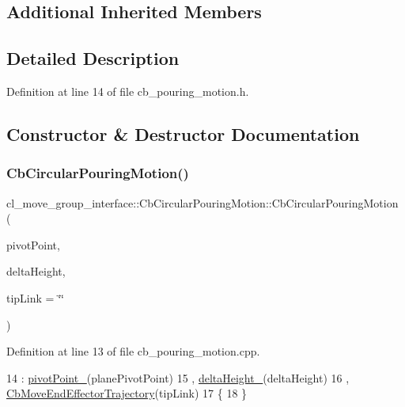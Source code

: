 \subsection*{Additional Inherited Members}


\subsection{Detailed Description}


Definition at line 14 of file cb\+\_\+pouring\+\_\+motion.\+h.



\subsection{Constructor \& Destructor Documentation}
\mbox{\label{classcl__move__group__interface_1_1CbCircularPouringMotion_a774a9d74ca112002c89a375f06166257}} 
\subsubsection{\texorpdfstring{Cb\+Circular\+Pouring\+Motion()}{CbCircularPouringMotion()}}
{\footnotesize\ttfamily cl\+\_\+move\+\_\+group\+\_\+interface\+::\+Cb\+Circular\+Pouring\+Motion\+::\+Cb\+Circular\+Pouring\+Motion (\begin{DoxyParamCaption}\item[{const geometry\+\_\+msgs\+::\+Point\+Stamped \&}]{pivot\+Point,  }\item[{double}]{delta\+Height,  }\item[{std\+::string}]{tip\+Link = {\ttfamily \char`\"{}\char`\"{}} }\end{DoxyParamCaption})}



Definition at line 13 of file cb\+\_\+pouring\+\_\+motion.\+cpp.


\begin{DoxyCode}
14         : \hyperlink{classcl__move__group__interface_1_1CbCircularPouringMotion_a4c100d8ba3e57f7ddfb614017d115fca}{pivotPoint\_}(planePivotPoint)
15         , \hyperlink{classcl__move__group__interface_1_1CbCircularPouringMotion_a7009d617bcd8ac1fba49100444434f3c}{deltaHeight\_}(deltaHeight)
16         , \hyperlink{classcl__move__group__interface_1_1CbMoveEndEffectorTrajectory_af7e718b0c53e912fd74968abbb0a4810}{CbMoveEndEffectorTrajectory}(tipLink)
17     \{
18     \}
\end{DoxyCode}


